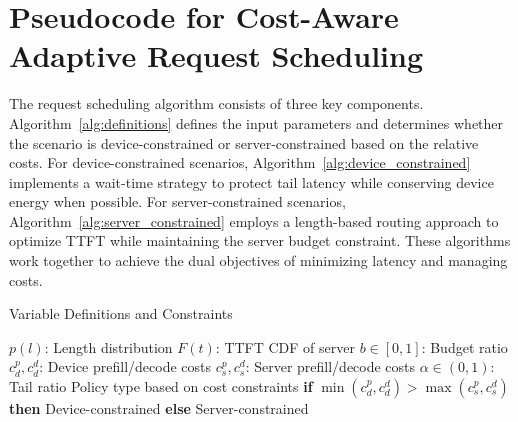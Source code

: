 \section{Pseudocode for Cost-Aware Adaptive Request Scheduling}\label{appendix:pseudocode_scheduling}

The request scheduling algorithm consists of three key components. Algorithm~\ref{alg:definitions} defines the input parameters and determines whether the scenario is device-constrained or server-constrained based on the relative costs. For device-constrained scenarios, Algorithm~\ref{alg:device_constrained} implements a wait-time strategy to protect tail latency while conserving device energy when possible. For server-constrained scenarios, Algorithm~\ref{alg:server_constrained} employs a length-based routing approach to optimize TTFT while maintaining the server budget constraint. These algorithms work together to achieve the dual objectives of minimizing latency and managing costs.

\begin{algorithm}[ht]
\caption{Variable Definitions and Constraints}
\label{alg:definitions}
\begin{algorithmic}[1]
\REQUIRE
    \STATE $p(l)$: Length distribution
    \STATE $F(t)$: TTFT CDF of server
    \STATE $b \in [0,1]$: Budget ratio 
    \STATE $c^p_d,c^d_d$: Device prefill/decode costs
    \STATE $c^p_s,c^d_s$: Server prefill/decode costs
    \STATE $\alpha \in (0,1)$: Tail ratio
\ENSURE Policy type based on cost constraints
\STATE \textbf{if} $\min(c^p_d,c^d_d) > \max(c^p_s,c^d_s)$ \textbf{then} Device-constrained
\STATE \textbf{else} Server-constrained
\end{algorithmic}
\end{algorithm}

